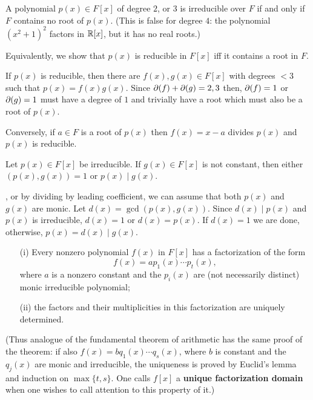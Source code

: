 \begin{myenumerate}

\item
\begin{excopy}
A polynomial \(p(x)\in F[x]\) of degree $2$, or $3$ is irreducible over $F$
\label{ex:irr23}
if and only if $F$ contains no root of \(p(x)\).
(This is false for degree $4$: the polynomial \((x^2+1)^2\)
factors in \(\mathbb{R}[x]\), but it has no real roots.)
\end{excopy}

Equivalently, we show that \(p(x)\) is reducible in \(F[x]\) iff
it contains a root  in $F$.

If \(p(x)\) is reducible, then there are \(f(x),g(x)\in F[x]\)
with degrees \(<3\)
such that \(p(x)=f(x)g(x)\).
Since  \(\partial(f)+\partial(g)=2,3\)
then, \(\partial(f)=1\) or  \(\partial(g)=1\) must have a degree of $1$
and trivially have a root which must also be a root of \(p(x)\).

Conversely, if \(a\in F\) is a root of \(p(x)\) then \(f(x)=x-a\)
divides \(p(x)\) and \(p(x)\) is reducible.

\item
\begin{excopy}
Let \(p(x)\in F[x]\) be irreducible. If \(g(x)\in F[x]\) is not constant,
then either \((p(x),g(x))=1\) or \(p(x)\mid g(x)\).
\end{excopy}

\Wlogy, or by dividing by leading coefficient,
we can assume that both \(p(x)\) and \(g(x)\) are monic.
Let \(d(x)=\gcd(p(x),g(x))\). Since \(d(x)\mid p(x)\) and \(p(x)\)
is irreducible, \(d(x)=1\) or \(d(x)=p(x)\).
If \(d(x)=1\) we are done, otherwise, \(p(x)=d(x)\mid g(x)\).


\item
\begin{excopy}
\begin{itemize}
 \item[(i)]
   Every nonzero polynomial \(f(x)\) in \(F[x]\) has a factorization
   of the form
   \[f(x) = a p_1(x)\cdots p_t(x),\]
   where $a$ is a nonzero constant and the \(p_i(x)\) are (not necessarily
   distinct) monic irreducible polynomial;
 \item[(ii)]
   the factors and their multiplicities in this factorization are uniquely
   determined.
\end{itemize}

(Thus analogue of the fundamental theorem of arithmetic has the same
proof of the theorem: if also \(f(x)=bq_1(x)\cdots q_s(x)\),
where $b$ is constant and the \(q_j(x)\) are monic and irreducible,
the uniqueness is proved by Euclid's lemma and induction on \(\max\{t,s\}\).
One calls \(f[x]\)
a \textbf{unique factorization domain} when one wishes to call
attention to this property of it.)
\end{excopy}


\end{myenumerate}
